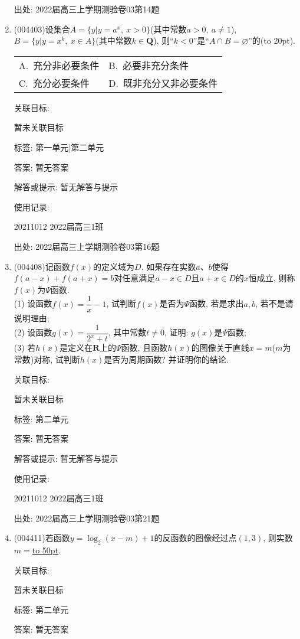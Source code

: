 \documentclass[10pt,a4paper]{article}
\newcommand{\blank}[1]{\underline{\hbox to #1pt{}}}
\newcommand{\bracket}[1]{(\hbox to #1pt{})}
\newcommand{\twoch}[4]{\par\begin{tabular}{p{.46\textwidth}p{.46\textwidth}}
A.~#1& B.~#2\\
C.~#3& D.~#4
\end{tabular}}
\begin{document}
\begin{enumerate}[1.]
出处: 2022届高三上学期测验卷03第14题
\item { (004403)}设集合$A=\{y|y=a^x,\ x>0\}$(其中常数$a>0,  \ a\ne 1$), $B=\{y|y=x^k,\ x\in A\}$(其中常数$k\in \mathbf{Q}$), 则``$k<0$''是``$A\cap B=\varnothing$''的\bracket{20}.
\twoch{充分非必要条件}{必要非充分条件}{充分必要条件}{既非充分又非必要条件}


关联目标:

暂未关联目标



标签: 第一单元|第二单元

答案: 暂无答案

解答或提示: 暂无解答与提示

使用记录:

20211012	2022届高三1班	


出处: 2022届高三上学期测验卷03第16题
\item { (004408)}记函数$f(x)$的定义域为$D$. 如果存在实数$a$、$b$使得$f(a-x)+f(a+x)=b$对任意满足$a-x\in D$且$a+x\in D$的$x$恒成立, 则称$f(x)$为$\Psi$函数.\\
(1) 设函数$f(x)=\dfrac 1x-1$, 试判断$f(x)$是否为$\Psi$函数, 若是求出$a,b$, 若不是请说明理由;\\
(2) 设函数$g(x)=\dfrac 1{2^x+t}$, 其中常数$t\ne 0$, 证明: $g(x)$是$\Psi$函数;\\
(3) 若$h(x)$是定义在$\mathbf{R}$上的$\Psi$函数, 且函数$h(x)$的图像关于直线$x=m$($m$为常数)对称, 试判断$h(x)$是否为周期函数? 并证明你的结论.


关联目标:

暂未关联目标



标签: 第二单元

答案: 暂无答案

解答或提示: 暂无解答与提示

使用记录:

20211012	2022届高三1班			


出处: 2022届高三上学期测验卷03第21题
\item { (004411)}若函数$y=\log_2(x-m)+1$的反函数的图像经过点$(1,3)$, 则实数$m=$\blank{50}.


关联目标:

暂未关联目标



标签: 第二单元

答案: 暂无答案


\end{enumerate}
\end{document}
